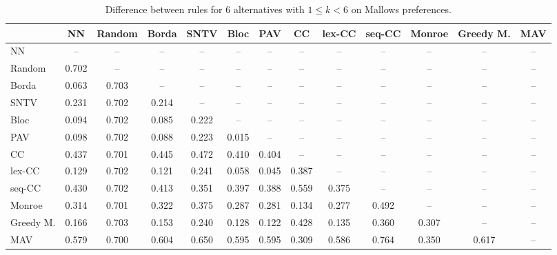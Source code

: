 
\begin{table*}[htbp]
\centering
\begin{tabular}{lcccccccccccc}
\toprule
 & NN & Random & Borda & SNTV & Bloc & PAV & CC & lex-CC & seq-CC & Monroe & Greedy M. & MAV \\
\midrule
NN & -- & -- & -- & -- & -- & -- & -- & -- & -- & -- & -- & -- \\
Random & \cellcolor{blue!70} 0.702 & -- & -- & -- & -- & -- & -- & -- & -- & -- & -- & -- \\
Borda & \cellcolor{blue!6} 0.063 & \cellcolor{blue!70} 0.703 & -- & -- & -- & -- & -- & -- & -- & -- & -- & -- \\
SNTV & \cellcolor{blue!23} 0.231 & \cellcolor{blue!70} 0.702 & \cellcolor{blue!21} 0.214 & -- & -- & -- & -- & -- & -- & -- & -- & -- \\
Bloc & \cellcolor{blue!9} 0.094 & \cellcolor{blue!70} 0.702 & \cellcolor{blue!8} 0.085 & \cellcolor{blue!22} 0.222 & -- & -- & -- & -- & -- & -- & -- & -- \\
PAV & \cellcolor{blue!9} 0.098 & \cellcolor{blue!70} 0.702 & \cellcolor{blue!8} 0.088 & \cellcolor{blue!22} 0.223 & \cellcolor{blue!1} 0.015 & -- & -- & -- & -- & -- & -- & -- \\
CC & \cellcolor{blue!43} 0.437 & \cellcolor{blue!70} 0.701 & \cellcolor{blue!44} 0.445 & \cellcolor{blue!47} 0.472 & \cellcolor{blue!41} 0.410 & \cellcolor{blue!40} 0.404 & -- & -- & -- & -- & -- & -- \\
lex-CC & \cellcolor{blue!12} 0.129 & \cellcolor{blue!70} 0.702 & \cellcolor{blue!12} 0.121 & \cellcolor{blue!24} 0.241 & \cellcolor{blue!5} 0.058 & \cellcolor{blue!4} 0.045 & \cellcolor{blue!38} 0.387 & -- & -- & -- & -- & -- \\
seq-CC & \cellcolor{blue!43} 0.430 & \cellcolor{blue!70} 0.702 & \cellcolor{blue!41} 0.413 & \cellcolor{blue!35} 0.351 & \cellcolor{blue!39} 0.397 & \cellcolor{blue!38} 0.388 & \cellcolor{blue!55} 0.559 & \cellcolor{blue!37} 0.375 & -- & -- & -- & -- \\
Monroe & \cellcolor{blue!31} 0.314 & \cellcolor{blue!70} 0.701 & \cellcolor{blue!32} 0.322 & \cellcolor{blue!37} 0.375 & \cellcolor{blue!28} 0.287 & \cellcolor{blue!28} 0.281 & \cellcolor{blue!13} 0.134 & \cellcolor{blue!27} 0.277 & \cellcolor{blue!49} 0.492 & -- & -- & -- \\
Greedy M. & \cellcolor{blue!16} 0.166 & \cellcolor{blue!70} 0.703 & \cellcolor{blue!15} 0.153 & \cellcolor{blue!24} 0.240 & \cellcolor{blue!12} 0.128 & \cellcolor{blue!12} 0.122 & \cellcolor{blue!42} 0.428 & \cellcolor{blue!13} 0.135 & \cellcolor{blue!36} 0.360 & \cellcolor{blue!30} 0.307 & -- & -- \\
MAV & \cellcolor{blue!57} 0.579 & \cellcolor{blue!70} 0.700 & \cellcolor{blue!60} 0.604 & \cellcolor{blue!65} 0.650 & \cellcolor{blue!59} 0.595 & \cellcolor{blue!59} 0.595 & \cellcolor{blue!30} 0.309 & \cellcolor{blue!58} 0.586 & \cellcolor{blue!76} 0.764 & \cellcolor{blue!35} 0.350 & \cellcolor{blue!61} 0.617 & -- \\
\bottomrule
\end{tabular}

\caption{Difference between rules for 6 alternatives with $1 \leq k < 6$ on Mallows preferences.}
\label{tab:rule_distance_heatmap-m=[6]-pref_dist=MALLOWS-RELPHI-R}
\end{table*}
    